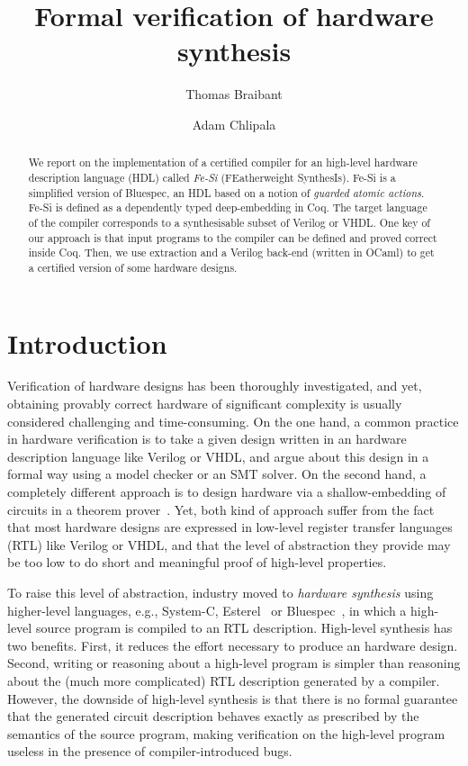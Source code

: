 \documentclass{llncs}
\author{Thomas Braibant \and Adam Chlipala}
\institute{}
\title{Formal verification of hardware synthesis}
\begin{document}
\maketitle

\begin{abstract}
  We report on the implementation of a certified compiler for an
  high-level hardware description language (HDL) called \emph{Fe-Si}
  (FEatherweight SynthesIs).
  Fe-Si is a simplified version of Bluespec, an HDL based on a notion
  of \emph{guarded atomic actions}. Fe-Si is defined as a
  dependently typed deep-embedding in Coq. The target language of the
  compiler corresponds to a synthesisable subset of Verilog or VHDL.
  One key of our approach is that input programs to the compiler can
  be defined and proved correct inside Coq. Then, we use extraction
  and a Verilog back-end (written in OCaml) to get a certified version
  of some hardware designs.
\end{abstract}

\section*{Introduction}
Verification of hardware designs has been thoroughly investigated, and
yet, obtaining provably correct hardware of significant complexity is
usually considered challenging and time-consuming. 
%
On the one hand, a common practice in hardware verification is to take
a given design written in an hardware description language like
Verilog or VHDL, and argue about this design in a formal way using a
model checker or an SMT solver.
%
On the second hand, a completely different approach is to design
hardware via a shallow-embedding of circuits in a theorem
prover~\cite{hanna-veritas,UCAM-CL-TR-77,hunt89,vamp,certifying-circuits-in-type-theory}.
%
Yet, both kind of approach suffer from the fact that most hardware
designs are expressed in low-level register transfer languages (RTL)
like Verilog or VHDL, and that the level of abstraction they provide
may be too low to do short and meaningful proof of high-level
properties.

\medskip

To raise this level of abstraction, industry moved to \emph{hardware
  synthesis} using higher-level languages, e.g., System-C,
Esterel~\cite{DBLP:conf/birthday/Berry00} or
Bluespec~\cite{bluespec}, in which a high-level source program is
compiled to an RTL description. 
%
High-level synthesis has two benefits. 
%
First, it reduces the effort necessary to produce an hardware design.
%
Second, writing or reasoning about a high-level program is simpler
than reasoning about the (much more complicated) RTL description
generated by a compiler.
%
However, the downside of high-level synthesis is that there is no
formal guarantee that the generated circuit description behaves
exactly as prescribed by the semantics of the source
program, making verification on the high-level program useless in the
presence of compiler-introduced bugs.
%
\end{document}
